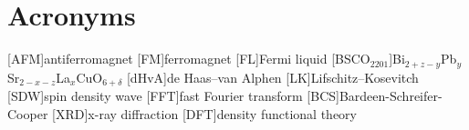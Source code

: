 
\section{Acronyms}

\begin{acronym}
    [AFM]{antiferromagnet}
    [FM]{ferromagnet}
    [FL]{Fermi liquid}
    [BSCO$_{2201}$]{Bi$_{2+z-y}$Pb$_{y}$Sr$_{2-x-z}$La$_{x}$CuO$_{6+\delta}$}
    [dHvA]{de Haas--van Alphen}
    [LK]{Lifschitz--Kosevitch}
    [SDW]{spin density wave}
    [FFT]{fast Fourier transform}
    [BCS]{Bardeen-Schreifer-Cooper}
    [XRD]{x-ray diffraction}
    [DFT]{density functional theory}
\end{acronym}


